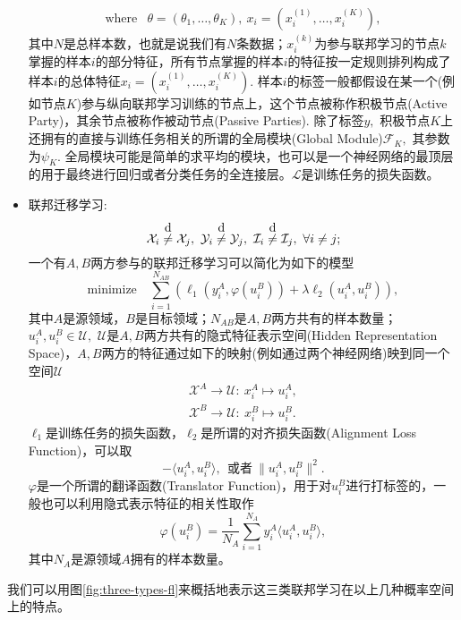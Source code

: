 \begin{itemize}
\begin{equation}
\begin{array}{cl}
\text{where} & \theta = (\theta_{1}, \ldots, \theta_{K}), ~ x_{i} = (x_{i}^{(1)}, \ldots, x_{i}^{(K)}),
\end{array}
\end{equation}
其中$N$是总样本数，也就是说我们有$N$条数据；$x_{i}^{(k)}$为参与联邦学习的节点$k$掌握的样本$i$的部分特征，所有节点掌握的样本$i$的特征按一定规则排列构成了样本$i$的总体特征$x_{i} = (x_{i}^{(1)}, \ldots, x_{i}^{(K)}).$ 样本$i$的标签一般都假设在某一个(例如节点$K$)参与纵向联邦学习训练的节点上，这个节点被称作积极节点(Active Party)，其余节点被称作被动节点(Passive Parties). 除了标签$y,$ 积极节点$K$上还拥有的直接与训练任务相关的所谓的全局模块(Global Module)$\mathcal{F}_K,$ 其参数为$\psi_K.$ 全局模块可能是简单的求平均的模块，也可以是一个神经网络的最顶层的用于最终进行回归或者分类任务的全连接层。$\mathcal{L}$是训练任务的损失函数。
\item 联邦迁移学习:
\begin{equation*}
\mathcal{X}_i \neqabove{d} \mathcal{X}_j, ~ \mathcal{Y}_i \neqabove{d} \mathcal{Y}_j, ~ \mathcal{I}_i \neqabove{d} \mathcal{I}_j, ~ \forall i \neq j;
\end{equation*}
一个有$A, B$两方参与的联邦迁移学习可以简化为如下的模型\cite{liu_2020_transfer_fl}
\begin{equation}
\label{eq:general-ftl}
\text{minimize} \quad \sum_{i=1}^{N_{AB}} \left( \ell_1(y_i^A, \varphi(u_i^B)) + \lambda \ell_2(u_i^A, u_i^B)  \right),
\end{equation}
其中$A$是源领域，$B$是目标领域；$N_{AB}$是$A, B$两方共有的样本数量；$u_i^A, u_i^B \in \mathcal{U},$ $\mathcal{U}$是$A, B$两方共有的隐式特征表示空间(Hidden Representation Space)，$A, B$两方的特征通过如下的映射(例如通过两个神经网络)映到同一个空间$\mathcal{U}$
\begin{gather*}
\mathcal{X}^A \to \mathcal{U}: ~ x_i^A \mapsto u_i^A, \\ \mathcal{X}^B \to \mathcal{U}: ~ x_i^B \mapsto u_i^B.
\end{gather*}
$\ell_1$是训练任务的损失函数，$\ell_2$是所谓的对齐损失函数(Alignment Loss Function)，可以取
\begin{equation*}
- \langle u_i^A, u_i^B \rangle, ~~ \text{或者} ~ \lVert u_i^A, u_i^B \rVert^2.
\end{equation*}
$\varphi$是一个所谓的翻译函数(Translator Function)，用于对$u_i^B$进行打标签的，一般也可以利用隐式表示特征的相关性取作
\begin{equation}
\label{eq:ftl-translator-func}
\varphi(u_i^B) = \frac{1}{N_A} \sum\limits_{i=1}^{N_A} y_i^A \langle u_i^A, u_i^B \rangle,
\end{equation}
其中$N_{A}$是源领域$A$拥有的样本数量。
\end{itemize}
我们可以用图\ref{fig:three-types-fl}来概括地表示这三类联邦学习在以上几种概率空间上的特点。

